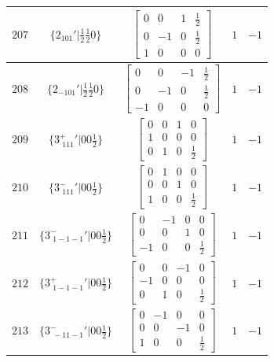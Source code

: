 \documentclass[fleqn,8pt]{jsarticle}
\begin{document}
\begin{longtable}{ccccc}
$ 207 $ & $ \{2{}_{101}{}'|\frac{1}{2} \frac{1}{2} 0\} $ & $ \begin{bmatrix} 0 & 0 & 1 & \frac{1}{2} \\ 0 & -1 & 0 & \frac{1}{2} \\ 1 & 0 & 0 & 0 \end{bmatrix} $ & $ 1 $ & $ -1 $ \\ \hline
$ 208 $ & $ \{2{}_{-101}{}'|\frac{1}{2} \frac{1}{2} 0\} $ & $ \begin{bmatrix} 0 & 0 & -1 & \frac{1}{2} \\ 0 & -1 & 0 & \frac{1}{2} \\ -1 & 0 & 0 & 0 \end{bmatrix} $ & $ 1 $ & $ -1 $ \\ \hline
$ 209 $ & $ \{3^{+}_{\,\,111}{}'|0 0 \frac{1}{2}\} $ & $ \begin{bmatrix} 0 & 0 & 1 & 0 \\ 1 & 0 & 0 & 0 \\ 0 & 1 & 0 & \frac{1}{2} \end{bmatrix} $ & $ 1 $ & $ -1 $ \\ \hline
$ 210 $ & $ \{3^{-}_{\,\,111}{}'|0 0 \frac{1}{2}\} $ & $ \begin{bmatrix} 0 & 1 & 0 & 0 \\ 0 & 0 & 1 & 0 \\ 1 & 0 & 0 & \frac{1}{2} \end{bmatrix} $ & $ 1 $ & $ -1 $ \\ \hline
$ 211 $ & $ \{3^{-}_{\,\,1-1-1}{}'|0 0 \frac{1}{2}\} $ & $ \begin{bmatrix} 0 & -1 & 0 & 0 \\ 0 & 0 & 1 & 0 \\ -1 & 0 & 0 & \frac{1}{2} \end{bmatrix} $ & $ 1 $ & $ -1 $ \\ \hline
$ 212 $ & $ \{3^{+}_{\,\,1-1-1}{}'|0 0 \frac{1}{2}\} $ & $ \begin{bmatrix} 0 & 0 & -1 & 0 \\ -1 & 0 & 0 & 0 \\ 0 & 1 & 0 & \frac{1}{2} \end{bmatrix} $ & $ 1 $ & $ -1 $ \\ \hline
$ 213 $ & $ \{3^{-}_{\,\,-11-1}{}'|0 0 \frac{1}{2}\} $ & $ \begin{bmatrix} 0 & -1 & 0 & 0 \\ 0 & 0 & -1 & 0 \\ 1 & 0 & 0 & \frac{1}{2} \end{bmatrix} $ & $ 1 $ & $ -1 $ \\ \hline

\end{longtable}
\end{document}
